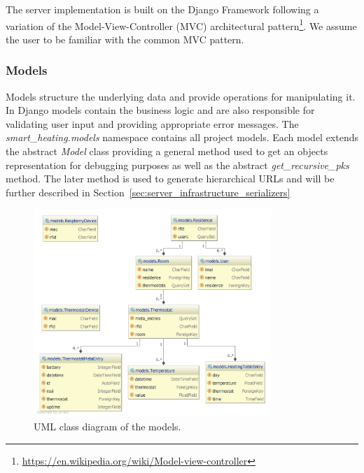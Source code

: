The server implementation is built on the Django Framework following a variation
of the Model-View-Controller (MVC) architectural pattern\footnote{\url{https://en.wikipedia.org/wiki/Model-view-controller}}.
We assume the user to be familiar with the common MVC pattern.

\subsubsection{Models}
\label{sec:server_infrastructure_models}

Models structure the underlying data and provide operations for manipulating it.
In Django models contain the business logic and are also responsible for validating user input and providing appropriate error messages.
The \emph{smart\_heating.models} namespace contains all project models.
Each model extends the abstract \emph{Model} class providing a general method used to get an objects representation for debugging purposes as well as the abstract \emph{get\_recursive\_pks} method.
The later method is used to generate hierarchical URLs and will be further described in Section~\ref{sec:server_infrastructure_serializers}

\begin{figure}[h]
\begin{center}
\includegraphics[width=0.8\textwidth]{images/uml_class_diagram_pycharm_highres.png}
\end{center}
\caption{UML class diagram of the models.}
\label{fig:class_diagram}
\end{figure}

